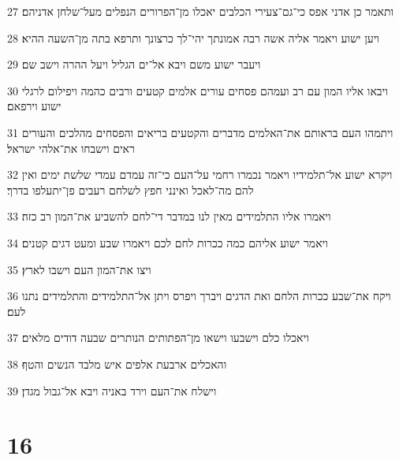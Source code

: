 \par 27 ותאמר כן אדני אפס כי־גם־צעירי הכלבים יאכלו מן־הפרורים הנפלים מעל־שלחן אדניהם׃
\par 28 ויען ישוע ויאמר אליה אשה רבה אמונתך יהי־לך כרצונך ותרפא בתה מן־השעה ההיא׃
\par 29 ויעבר ישוע משם ויבא אל־ים הגליל ויעל ההרה וישב שם׃
\par 30 ויבאו אליו המון עם רב ועמהם פסחים עורים אלמים קטעים ורבים כהמה ויפילום לרגלי ישוע וירפאם׃
\par 31 ויתמהו העם בראותם את־האלמים מדברים והקטעים בריאים והפסחים מהלכים והעורים ראים וישבחו את־אלהי ישראל׃
\par 32 ויקרא ישוע אל־תלמידיו ויאמר נכמרו רחמי על־העם כי־זה עמדם עמדי שלשת ימים ואין להם מה־לאכל ואינני חפץ לשלחם רעבים פן־יתעלפו בדרך׃
\par 33 ויאמרו אליו התלמידים מאין לנו במדבר די־לחם להשביע את־המון רב כזה׃
\par 34 ויאמר ישוע אליהם כמה ככרות לחם לכם ויאמרו שבע ומעט דגים קטנים׃
\par 35 ויצו את־המון העם וישבו לארץ׃
\par 36 ויקח את־שבע ככרות הלחם ואת הדגים ויברך ויפרס ויתן אל־התלמידים והתלמידים נתנו לעם׃
\par 37 ויאכלו כלם וישבעו וישאו מן־הפתותים הנותרים שבעה דודים מלאים׃
\par 38 והאכלים ארבעת אלפים איש מלבד הנשים והטף׃
\par 39 וישלח את־העם וירד באניה ויבא אל־גבול מגדן׃

\chapter{16}

